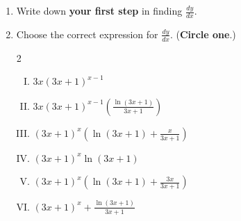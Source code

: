\documentclass[12pt]{article}
\renewcommand{\emph}[1]{\textsf{\textbf{#1}}}
\newcounter{probcount}
\newcounter{subprobcount}
\newenvironment{subproblems}{%
\begin{enumerate}%
\setcounter{enumi}{\value{subprobcount}}%
\renewcommand{\theenumi}{\emph{\alph{enumi}}}}%
{\setcounter{subprobcount}{\value{enumi}}\end{enumerate}}
\begin{document}
\begin{subproblems}

\item Write down \textbf{your first step} in finding $\displaystyle \frac{dy}{dx}$.

\vfill

\item Choose the correct expression for $\displaystyle\frac{dy}{dx}$. ({\bf Circle one}.)

\begin{multicols}{2}
\begin{enumerate}[(I)]

\item $\displaystyle 3x(3x+1)^{x-1}$\\

\item $\displaystyle 3x(3x+1)^{x-1}\left(\frac{\ln(3x+1)}{3x+1}\right)$\\

\item $\displaystyle(3x+1)^x\left(\ln(3x+1)+\frac{x}{3x+1}\right)$\\

\item $\displaystyle (3x+1)^x\ln(3x+1)$\\

\item $\displaystyle(3x+1)^x\left(\ln(3x+1)+\frac{3x}{3x+1}\right)$\\

\item $\displaystyle(3x+1)^x + \frac{\ln(3x+1)}{3x+1}$\\

\end{enumerate}

\end{multicols}
\end{subproblems}
\end{document}
